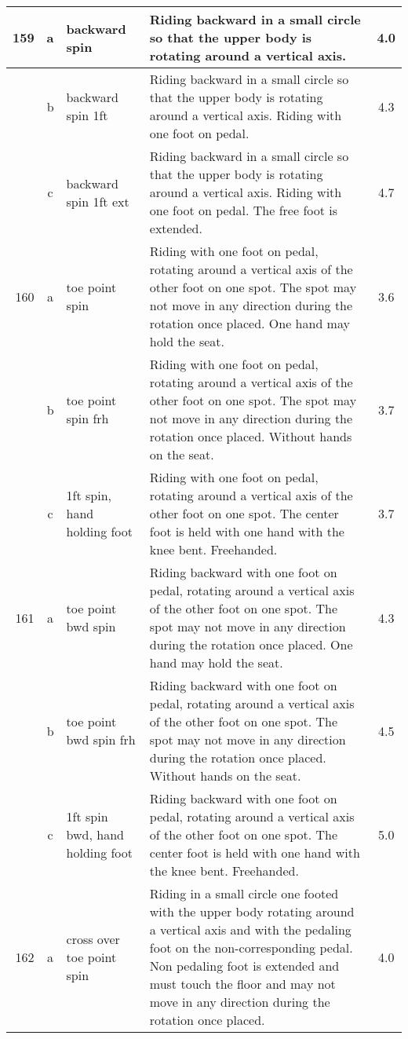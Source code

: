 \begin{longtable}{|r|c|p{4cm}|p{8cm}|c|}
\hline
159 & a & backward spin & Riding backward in a small circle so that the upper body is rotating around a vertical axis.  & 4.0 \\ 
\hline
  & b & backward spin 1ft & Riding backward in a small circle so that the upper body is rotating around a vertical axis. Riding with one foot on pedal. & 4.3 \\ 
\hline
  & c & backward spin 1ft ext & Riding backward in a small circle so that the upper body is rotating around a vertical axis. Riding with one foot on pedal. The free foot is extended.  & 4.7 \\ 
\hline
160 & a & toe point spin  & Riding with one foot on pedal, rotating around a vertical axis of the other foot on one spot. The spot may not move in any direction during the rotation once placed. One hand may hold the seat. & 3.6 \\ 
\hline
  & b & toe point spin frh  & Riding with one foot on pedal, rotating around a vertical axis of the other foot on one spot. The spot may not move in any direction during the rotation once placed. Without hands on the seat.  & 3.7 \\ 
\hline
  & c & 1ft spin, hand holding foot & Riding with one foot on pedal, rotating around a vertical axis of the other foot on one spot. The center foot is held with one hand with the knee bent. Freehanded. & 3.7 \\ 
\hline
161 & a & toe point bwd spin  & Riding backward with one foot on pedal, rotating around a vertical axis of the other foot on one spot. The spot may not move in any direction during the rotation once placed. One hand may hold the seat.  & 4.3 \\ 
\hline
  & b & toe point bwd spin frh  & Riding backward with one foot on pedal, rotating around a vertical axis of the other foot on one spot. The spot may not move in any direction during the rotation once placed. Without hands on the seat. & 4.5 \\ 
\hline
  & c & 1ft spin bwd, hand holding foot & Riding backward with one foot on pedal, rotating around a vertical axis of the other foot on one spot. The center foot is held with one hand with the knee bent. Freehanded.  & 5.0 \\ 
\hline
162 & a & cross over toe point spin & Riding in a small circle one footed with the upper body rotating around a vertical axis and with the pedaling foot on the non-corresponding pedal. Non pedaling foot is extended and must touch the floor and may not move in any direction during the rotation once placed.  & 4.0 \\ 

\end{longtable}

